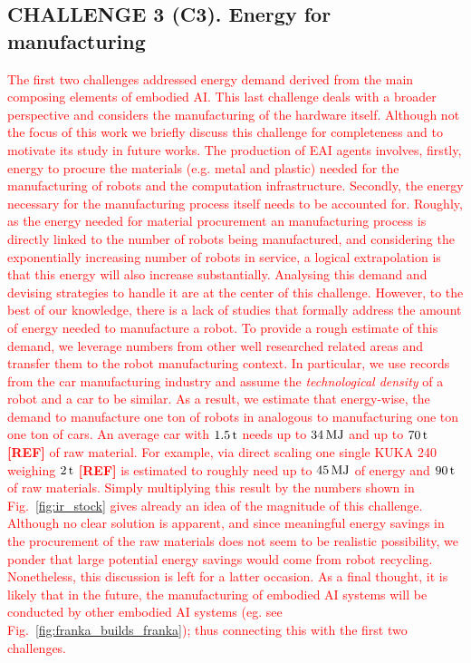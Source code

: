 \subsection{\textbf{CHALLENGE 3} (C3). Energy for manufacturing}
\textcolor{red}{The first two challenges addressed energy demand derived from the main composing elements of embodied AI. This last challenge deals with a broader perspective and considers the manufacturing of the hardware itself. Although not the focus of this work we briefly discuss this challenge for completeness and to motivate its study in future works. The production of EAI agents involves, firstly, energy to procure the materials (e.g. metal and plastic) needed for the manufacturing of robots and the computation infrastructure. Secondly, the energy necessary for the manufacturing process itself needs to be accounted for. Roughly, as the energy needed for material procurement an manufacturing process is directly linked to the number of robots being manufactured, and considering the exponentially increasing number of robots in service, a logical extrapolation is that this energy will also increase substantially. Analysing this demand and devising strategies to handle it are at the center of this challenge. However, to the best of our knowledge, there is a lack of studies that formally address the amount of energy needed to manufacture a robot. To provide a rough estimate of this demand, we leverage numbers from other well researched related areas and transfer them to the robot manufacturing context. In particular, we use records from the car manufacturing industry \cite{sullivan2010energy} and assume the \emph{technological density} of a robot and a car to be similar. As a result, we estimate that energy-wise, the demand to manufacture one ton of robots in analogous to manufacturing one ton one ton of cars. An average car with $\unit[1.5]{t}$ needs up to $\unit[34]{MJ}$ and up to $\unit[70]{t}$ \textcolor{red}{\textbf{[REF]}} of raw material. For example, \textcolor{red}{via direct scaling} one single KUKA 240 weighing $\unit[2]{t}$ \textcolor{red}{\textbf{[REF]}} is estimated to roughly need up to $\unit[45]{MJ}$ of energy and $\unit[90]{t}$ of raw materials. Simply multiplying this result by the numbers shown in Fig.~\ref{fig:ir_stock} gives already an idea of the magnitude of this challenge.  Although no clear solution is apparent, and since  meaningful energy savings in the procurement of the raw materials does not seem to be realistic possibility, we ponder that large potential energy savings would come from robot recycling. Nonetheless, this discussion is left for a latter occasion. As a final thought, it is likely that in the future, the manufacturing of embodied AI systems will be conducted by other embodied AI systems (eg. see Fig.~\ref{fig:franka_builds_franka}); thus connecting this with the first two challenges.}

